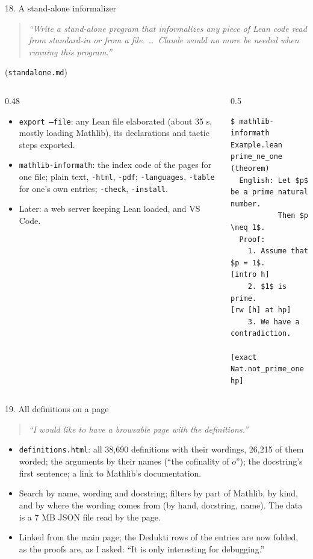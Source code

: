\documentclass[10pt,aspectratio=169]{beamer}
\newcommand{\prompt}[1]{\begin{quote}\small\itshape ``#1''\end{quote}}
\begin{document}
\begin{frame}[fragile]{18. A stand-alone informalizer}
  \footnotesize
  \prompt{Write a stand-alone program that informalizes any piece of Lean code read from
  standard-in or from a file. \dots\ Claude would no more be needed when running this
  program.} \hfill (\texttt{standalone.md})
  \begin{columns}[T]
    \begin{column}{0.48\textwidth}
      \begin{itemize}
        \item \texttt{export --file}: any Lean file elaborated (about 35 s, mostly loading
              Mathlib), its declarations and tactic steps exported.
        \item \texttt{mathlib-informath}: the index code of the pages for one file;
              plain text, \texttt{-html}, \texttt{-pdf}; \texttt{-languages},
              \texttt{-table} for one's own entries; \texttt{-check}, \texttt{-install}.
        \item Later: a web server keeping Lean loaded, and VS Code.
      \end{itemize}
    \end{column}
    \begin{column}{0.5\textwidth}
\begin{lstlisting}
$ mathlib-informath Example.lean
prime_ne_one (theorem)
  English: Let $p$ be a prime natural number.
           Then $p \neq 1$.
  Proof:
    1. Assume that $p = 1$.     [intro h]
    2. $1$ is prime.            [rw [h] at hp]
    3. We have a contradiction.
                   [exact Nat.not_prime_one hp]
\end{lstlisting}
    \end{column}
  \end{columns}
\end{frame}

\begin{frame}{19. All definitions on a page}
  \small
  \prompt{I would like to have a browsable page with the definitions.}
  \begin{itemize}
    \item \texttt{definitions.html}: all 38,690 definitions with their wordings, 26,215 of
          them worded; the arguments by their names (``the cofinality of $o$''); the
          docstring's first sentence; a link to Mathlib's documentation.
    \item Search by name, wording and docstring; filters by part of Mathlib, by kind, and
          by where the wording comes from (by hand, docstring, name). The data is a 7 MB
          JSON file read by the page.
    \item Linked from the main page; the Dedukti rows of the entries are now folded, as
          the proofs are, as I asked: ``It is only interesting for debugging.''
  \end{itemize}
\end{frame}
\end{document}
